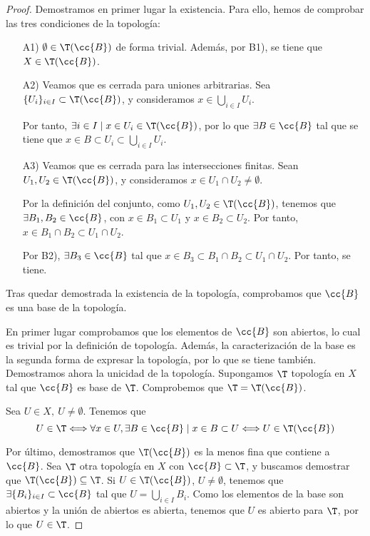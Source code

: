 \begin{proof}
    Demostramos en primer lugar la existencia. Para ello, hemos de comprobar las tres condiciones de la topología:
    \begin{enumerate}
        \item[A1)] $\emptyset\in \T(\cc{B})$ de forma trivial. Además, por B1), se tiene que $X\in \T(\cc{B})$.

        \item[A2)] Veamos que es cerrada para uniones arbitrarias. Sea $\{U_i\}_{i\in I}\subset \T(\cc{B})$, y consideramos $x\in \bigcup\limits_{i\in I}U_i$.
        
        Por tanto, $\exists i\in I\mid x\in U_i\in \T(\cc{B})$, por lo que $\exists B\in \cc{B}$ tal que se tiene que $x\in B\subset U_i\subset \bigcup\limits_{i\in I}U_i$.

        \item[A3)] Veamos que es cerrada para las intersecciones finitas. Sean $U_1,U_2\in \T(\cc{B})$, y consideramos $x\in U_1\cap U_2\neq \emptyset$.

        Por la definición del conjunto, como $U_1,U_2\in \T(\cc{B})$, tenemos que $\exists B_1,B_2\in \cc{B}$, con $x\in B_1\subset U_1$ y $x\in B_2\subset U_2$. Por tanto, $x\in B_1\cap B_2\subset U_1\cap U_2$.

        Por B2), $\exists B_3\in \cc{B}$ tal que $x\in B_3\subset B_1\cap B_2\subset U_1\cap U_2$. Por tanto, se tiene.
    \end{enumerate}

    Tras quedar demostrada la existencia de la topología, comprobamos que $\cc{B}$ es una base de la topología.
    
    En primer lugar comprobamos que los elementos de $\cc{B}$ son abiertos, lo cual es trivial por la definición de topología. Además, la caracterización de la base es la segunda forma de expresar la topología, por lo que se tiene también.\\

    Demostramos ahora la unicidad de la topología. Supongamos $\T$ topología en $X$ tal que $\cc{B}$ es base de $\T$. Comprobemos que $\T=\T(\cc{B})$.

    Sea $U\in X,~U\neq \emptyset$. Tenemos que
    \begin{equation*}
        U\in \T\Longleftrightarrow \forall x\in U, \exists B\in \cc{B}\mid x\in B\subset U
        \Longleftrightarrow U\in \T(\cc{B})
    \end{equation*}

    Por último, demostramos que $\T(\cc{B})$ es la menos fina que contiene a $\cc{B}$. Sea $\T$ otra topología en $X$ con $\cc{B}\subset \T$, y buscamos demostrar que $\T(\cc{B})\subseteq \T$. Si $U\in \T(\cc{B})$, $U\neq \emptyset$, tenemos que $\exists \{B_i\}_{i\in I}\subset \cc{B}$ tal que $U=\bigcup\limits_{i\in I} B_i$. Como los elementos de la base son abiertos y la unión de abiertos es abierta, tenemos que $U$ es abierto para $\T$, por lo que $U\in \T$.
\end{proof}

